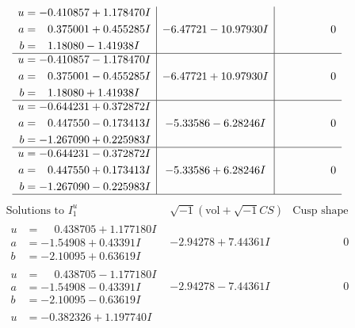 \documentclass[1p]{elsarticle_modified}
\theoremstyle{definition}
\newcommand{\I}{\sqrt{-1}}
\begin{document}
$$\begin{array}{c|c|c}
\begin{aligned}
u &= -0.410857 + 1.178470 I \\
a &= \phantom{-}0.375001 + 0.455285 I \\
b &= \phantom{-}1.18080 - 1.41938 I\end{aligned}
 & -6.47721 - 10.97930 I & \phantom{-0.000000 } 0 \\ \hline\begin{aligned}
u &= -0.410857 - 1.178470 I \\
a &= \phantom{-}0.375001 - 0.455285 I \\
b &= \phantom{-}1.18080 + 1.41938 I\end{aligned}
 & -6.47721 + 10.97930 I & \phantom{-0.000000 } 0 \\ \hline\begin{aligned}
u &= -0.644231 + 0.372872 I \\
a &= \phantom{-}0.447550 - 0.173413 I \\
b &= -1.267090 + 0.225983 I\end{aligned}
 & -5.33586 - 6.28246 I & \phantom{-0.000000 } 0 \\ \hline\begin{aligned}
u &= -0.644231 - 0.372872 I \\
a &= \phantom{-}0.447550 + 0.173413 I \\
b &= -1.267090 - 0.225983 I\end{aligned}
 & -5.33586 + 6.28246 I & \phantom{-0.000000 } 0\\
 \hline 
 \end{array}$$\newpage$$\begin{array}{c|c|c}  
\text{Solutions to }I^u_{1}& \I (\text{vol} + \sqrt{-1}CS) & \text{Cusp shape}\\
 \hline 
\begin{aligned}
u &= \phantom{-}0.438705 + 1.177180 I \\
a &= -1.54908 + 0.43391 I \\
b &= -2.10095 + 0.63619 I\end{aligned}
 & -2.94278 + 7.44361 I & \phantom{-0.000000 } 0 \\ \hline\begin{aligned}
u &= \phantom{-}0.438705 - 1.177180 I \\
a &= -1.54908 - 0.43391 I \\
b &= -2.10095 - 0.63619 I\end{aligned}
 & -2.94278 - 7.44361 I & \phantom{-0.000000 } 0 \\ \hline\begin{aligned}
u &= -0.382326 + 1.197740 I \\

\end{aligned}
\end{array}$$
\end{document}
